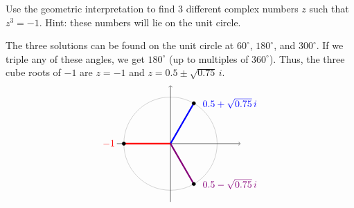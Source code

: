 \begin{ex}
  Use the geometric interpretation to find 3 different complex numbers
  $z$ such that $z^3 = -1$. Hint: these numbers will lie on the unit
  circle.
  \begin{sol}
    The three solutions can be found on the unit circle at
    $60^{\circ}$, $180^{\circ}$, and $300^{\circ}$. If we triple any
    of these angles, we get $180^{\circ}$ (up to multiples of $360^{\circ}$).
    Thus, the three cube roots of $-1$ are $z=-1$ and $z=0.5\pm\sqrt{0.75}\,i$.
    \begin{equation*}
      \begin{tikzpicture}[scale=1.7]
        \draw[black!30] (0,0) circle (1);
        \draw[->](-1.15,0) -- (1.5,0);
        \draw[->](0,-1.25) -- (0,1.25);
        \draw[ultra thick, blue] (0,0) -- (60:1);
        \draw[ultra thick, red] (0,0) -- (180:1);
        \draw[ultra thick, purple!70!blue] (0,0) -- (300:1);
        \draw[fill, black] (60:1) circle [radius=1.06pt] node [right=2mm,blue] {$0.5+\sqrt{0.75}\,i$};
        \draw[fill, black] (180:1) circle [radius=1.06pt] node [left=2mm,red] {$-1$};
        \draw[fill, black] (300:1) circle [radius=1.06pt] node [right=2mm,purple!70!blue] {$0.5-\sqrt{0.75}\,i$};
      \end{tikzpicture}
    \end{equation*}
  \end{sol}
\end{ex}

